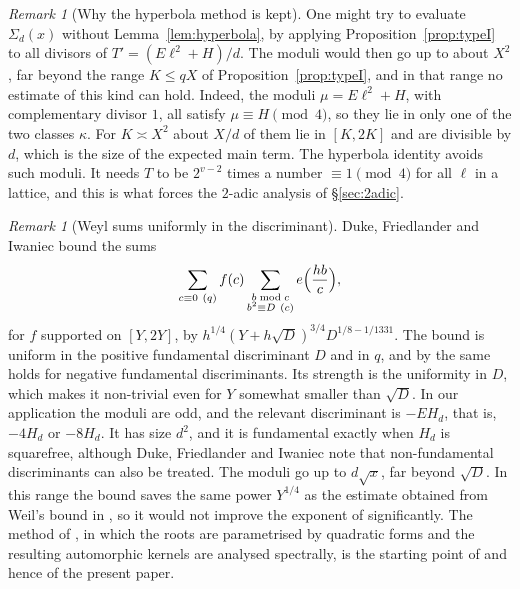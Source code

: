 \documentclass[11pt]{amsart}
\theoremstyle{remark}
\newtheorem{remark}[theorem]{Remark}
\theoremstyle{definition}
\numberwithin{equation}{section}
\begin{document}
\begin{remark}[Why the hyperbola method is kept]\label{rem:complementary}
One might try to evaluate $\Sigma_d(x)$ without Lemma~\ref{lem:hyperbola}, by applying Proposition~\ref{prop:typeI} to all divisors of $T'=(E\ell^2+H)/d$. The moduli would then go up to about $X^2$, far beyond the range $K\le qX$ of Proposition~\ref{prop:typeI}, and in that range no estimate of this kind can hold. Indeed, the moduli $\mu=E\ell^2+H$, with complementary divisor $1$, all satisfy $\mu\equiv H\pmod 4$, so they lie in only one of the two classes $\kappa$. For $K\asymp X^2$ about $X/d$ of them lie in $[K,2K]$ and are divisible by $d$, which is the size of the expected main term. The hyperbola identity avoids such moduli. It needs $T$ to be $2^{v-2}$ times a number $\equiv1\pmod 4$ for all $\ell$ in a lattice, and this is what forces the $2$-adic analysis of \S\ref{sec:2adic}.
\end{remark}

\begin{remark}[Weyl sums uniformly in the discriminant]\label{rem:DFI}
Duke, Friedlander and Iwaniec \cite[Theorem~1.1]{DFI12} bound the sums
\[
\sum_{c\equiv0\ (q)}f(c)\sum_{\substack{b\bmod c\\ b^2\equiv D\ (c)}}e\Bigl(\frac{hb}c\Bigr),
\]
for $f$ supported on $[Y,2Y]$, by $h^{1/4}(Y+h\sqrt D)^{3/4}D^{1/8-1/1331}$. The bound is uniform in the positive fundamental discriminant $D$ and in $q$, and by \cite[\S16]{DFI12} the same holds for negative fundamental discriminants. Its strength is the uniformity in $D$, which makes it non-trivial even for $Y$ somewhat smaller than $\sqrt D$. In our application the moduli are odd, and the relevant discriminant is $-EH_d$, that is, $-4H_d$ or $-8H_d$. It has size $d^2$, and it is fundamental exactly when $H_d$ is squarefree, although Duke, Friedlander and Iwaniec note that non-fundamental discriminants can also be treated. The moduli go up to $d\sqrt x$, far beyond $\sqrt D$. In this range the bound saves the same power $Y^{1/4}$ as the estimate obtained from Weil's bound in \cite[Proposition~6.3]{I}, so it would not improve the exponent of \cite{I} significantly. The method of \cite{DFI95,DFI12}, in which the roots are parametrised by quadratic forms and the resulting automorphic kernels are analysed spectrally, is the starting point of \cite{GM1,GM} and hence of the present paper.
\end{remark}
\end{document}
